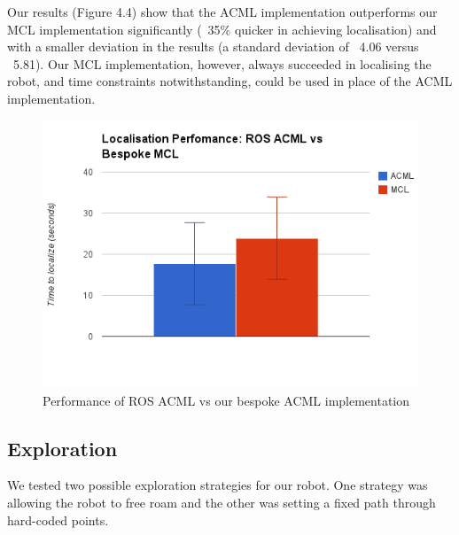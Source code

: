\documentclass{article}
\begin{document}
\begin{multicols}{2}
Our results (Figure 4.4) show that the ACML implementation outperforms our MCL implementation significantly (~35\% quicker in achieving localisation) and with a smaller deviation in the results (a standard deviation of ~4.06 versus ~5.81). Our MCL implementation, however, always succeeded in localising the robot, and time constraints notwithstanding, could be used in place of the ACML implementation.
	\begin{figure}[H]
	\begin{center}
	\includegraphics[width=0.9\linewidth]{ExperimentalResults8}
	\caption{Performance of ROS ACML vs our bespoke ACML implementation}
	\end{center}
	\end{figure}
	
	
	
	
	
	\subsection{Exploration}
	We tested two possible exploration strategies for our robot. One strategy was allowing the robot to free roam and the other was setting a fixed path through hard-coded points.
	

\end{multicols}
\end{document}
